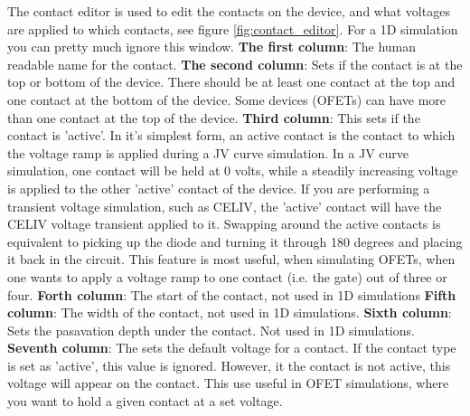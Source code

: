 \documentclass[11pt]{article}
\begin{document}
The contact editor is used to edit the contacts on the device, and what voltages are applied to which contacts, see figure \ref{fig:contact_editor}.  For a 1D simulation you can pretty much ignore this window.
\linebreak
\linebreak 
\textbf{The first column}: The human readable name for the contact.
\linebreak 
\linebreak 
\textbf{The second column}: Sets if the contact is at the top or bottom of the device.  There should be at least one contact at the top and one contact at the bottom of the device.  Some devices (OFETs) can have more than one contact at the top of the device. 
\linebreak
\linebreak 
\textbf{Third column}: This sets if the contact is 'active'.  In it's simplest form, an active contact is the contact to which the voltage ramp is applied during a JV curve simulation.  In a JV curve simulation, one contact will be held at 0 volts, while a steadily increasing voltage is applied to the other 'active' contact of the device.  If you are performing a transient voltage simulation, such as CELIV, the 'active' contact will have the CELIV voltage transient applied to it.  Swapping around the active contacts is equivalent to picking up the diode and turning it through 180 degrees and placing it back in the circuit.  This feature is most useful, when simulating OFETs, when one wants to apply a voltage ramp to one contact (i.e. the gate) out of three or four.
\linebreak
\linebreak 
\textbf{Forth column}: The start of the contact, not used in 1D simulations
\linebreak
\linebreak 
\textbf{Fifth column}: The width of the contact, not used in 1D simulations.
\linebreak
\linebreak
\textbf{Sixth column}: Sets the pasavation depth under the contact. Not used in 1D simulations.
\linebreak
\linebreak  
\textbf{Seventh column}: The sets the default voltage for a contact.  If the contact type is set as 'active', this value is ignored.  However, it the contact is not active, this voltage will appear on the contact.  This use useful in OFET simulations, where you want to hold a given contact at a set voltage. 
\linebreak
\linebreak  
\end{document}

